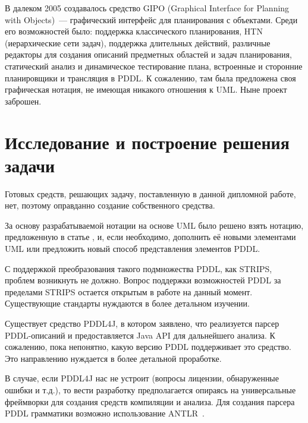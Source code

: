 \documentclass[a4paper,14pt]{extreport}
\begin{document}
    
    В далеком 2005 создавалось средство GIPO (Graphical Interface for Planning with Objects)\cite{gipo}~--- графический интерфейс для планирования с объектами.
 Среди его возможностей было: поддержка классического планирования, HTN (иерархические  сети задач), поддержка длительных действий, различные редакторы для создания описаний предметных областей и задач планирования, статический анализ и динамическое тестирование плана, встроенные и сторонние планировщики и трансляция в PDDL.
 К сожалению, там была предложена своя графическая нотация, не имеющая никакого отношения к UML.
 Ныне проект заброшен.
   

    
\section*{Исследование и построение решения задачи}
   
    Готовых средств, решающих задачу, поставленную в данной дипломной работе, нет, поэтому оправданно создание собственного средства.

    За основу разрабатываемой нотации на основе UML было решено взять нотацию, предложенную в статье \cite{mal-manz}, и, если необходимо, дополнить её новыми элементами UML или предложить новый способ представления элементов PDDL.

    С поддержкой преобразования такого подмножества PDDL, как STRIPS, проблем возникнуть не должно.
 Вопрос поддержки возможностей PDDL за пределами STRIPS остается открытым в работе на данный момент.
 Существующие стандарты нуждаются в более детальном изучении.

    Существует средство PDDL4J, в котором заявлено, что реализуется парсер PDDL-описаний и предоставляется Java API для дальнейшего анализа.
 К сожалению, пока непонятно, какую версию PDDL поддерживает это средство.
 Это направлению нуждается в более детальной проработке.
     
    В случае, если PDDL4J нас не устроит (вопросы лицензии, обнаруженные ошибки и т.д.), то вести разработку предполагается опираясь на универсальные фреймворки для создания средств компиляции и анализа.
 Для создания парсера PDDL грамматики возможно использование ANTLR~\cite{antlr}.
 
     
    
\end{document}
